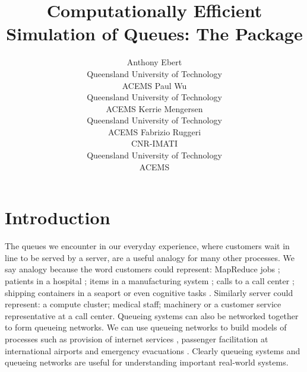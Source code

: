 \documentclass[article]{jss}
\author{Anthony  Ebert\\Queensland University of Technology\\ACEMS \And 
        Paul Wu\\Queensland University of Technology\\ACEMS \AND
        Kerrie Mengersen\\Queensland University of Technology\\ACEMS \And
        Fabrizio Ruggeri\\CNR-IMATI\\Queensland University of Technology\\ACEMS}
\title{Computationally Efficient Simulation of Queues: The \proglang{R} Package \pkg{queuecomputer}}
\begin{document}
\section{Introduction}



The queues we encounter in our everyday experience, where customers wait in line to be served by a server, are a useful analogy for many other processes. We say analogy because the word customers could represent: MapReduce jobs \citep{lin_joint_2013}; patients in a hospital \citep{takagi_queueing_2016}; items in a manufacturing system \citep{dallery_manufacturing_1992}; calls to a call center \citep{gans_telephone_2003}; shipping containers in a seaport \citep{kozan_comparison_1997} or even cognitive tasks \citep{cao_queueing_2013}. Similarly server could represent: a compute cluster; medical staff; machinery or a customer service representative at a call center. Queueing systems can also be networked together to form queueing networks. We can use queueing networks to build models of processes such as provision of internet services \citep{sutton_bayesian_2011}, passenger facilitation at international airports \citep{wu_review_2013} and emergency evacuations \citep{van_woensel_modeling_2007}. Clearly queueing systems and queueing networks are useful for understanding important real-world systems. 
\end{document}
